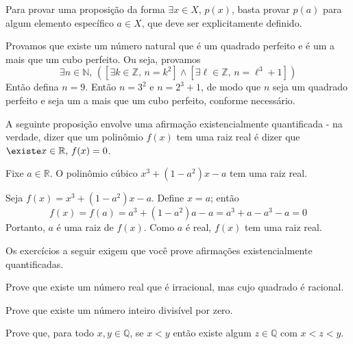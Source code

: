 \begin{strategy}
\label{strProvingExistential}
Para provar uma proposição da forma $\exists x \in X,\, p(x)$, basta provar $p(a)$ para algum elemento específico $a \in X$, que deve ser explicitamente definido.
\end{strategy}

\begin{example}
Provamos que existe um número natural que é um quadrado perfeito e é um a mais que um cubo perfeito. Ou seja, provamos
\[\exists n \in \mathbb{N},\, ([\exists k \in \mathbb{Z},\, n=k^2] \wedge [\exists \ell \in \mathbb{Z} ,\, n=\ell^3 + 1])\]
Então defina $n=9$. Então $n=3^2$ e $n=2^3+1$, de modo que $n$ seja um quadrado perfeito e seja um a mais que um cubo perfeito, conforme necessário.
\end{example}

A seguinte proposição envolve uma afirmação existencialmente quantificada - na verdade, dizer que um polinômio $f(x)$ tem uma raiz real é dizer que $\existe x \in \mathbb{R},\, f(x) = 0$.

\begin{proposition}
Fixe $a \in \mathbb{R}$. O polinômio cúbico $x^3 + (1-a^2)x - a$ tem uma raiz real.
\end{proposition}
\begin{cproof}
Seja $f(x)=x^3+(1-a^2)x-a$. Define $x=a$; então
\[f(x) = f(a) = a^3 + (1-a^2)a - a = a^3 + a - a^3 - a = 0\]
Portanto, $a$ é uma raiz de $f(x)$. Como $a$ é real, $f(x)$ tem uma raiz real.
\end{cproof}

Os exercícios a seguir exigem que você prove afirmações existencialmente quantificadas.

\begin{exercise}
Prove que existe um número real que é irracional, mas cujo quadrado é racional.\end
{exercise}

\begin{exercise}
Prove que existe um número inteiro divisível por zero.
\end{exercise}

\begin{example}
Prove que, para todo $x,y \in \mathbb{Q}$, se $x < y$ então existe algum $z \in \mathbb{Q}$ com $x<z<y$.
\end{example}

